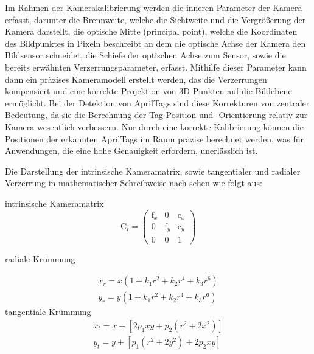 \documentclass[ngerman]{article}    %
\theoremstyle{definition}
\begin{document}
Im Rahmen der Kamerakalibrierung werden die inneren Parameter der Kamera erfasst, darunter die Brennweite, welche die Sichtweite und die Vergrößerung der Kamera darstellt, die optische Mitte (principal point), welche die Koordinaten des Bildpunktes in Pixeln beschreibt an dem die optische Achse der Kamera den Bildsensor schneidet, die Schiefe der optischen Achse zum Sensor, sowie die bereits erwähnten Verzerrungsparameter, erfasst. Mithilfe dieser Parameter kann dann ein präzises Kameramodell erstellt werden, das die Verzerrungen kompensiert und eine korrekte Projektion von 3D-Punkten auf die Bildebene ermöglicht. Bei der Detektion von AprilTags sind diese Korrekturen von zentraler Bedeutung, da sie die Berechnung der Tag-Position und -Orientierung relativ zur Kamera wesentlich verbessern. Nur durch eine korrekte Kalibrierung können die Positionen der erkannten AprilTags im Raum präzise berechnet werden, was für Anwendungen, die eine hohe Genauigkeit erfordern, unerlässlich ist. \cite{daftry2013flexible}



\newpage

Die Darstellung der intrinsische Kameramatrix, sowie tangentialer und radialer Verzerrung in mathematischer Schreibweise nach \cite{Zhang2023} sehen wie folgt aus:

intrinsische Kameramatrix
\begin{equation}   
    \text{C}_i =  \begin{pmatrix} \text{f}_x & 0 & \text{c}_x \\ 0 & \text{f}_y & \text{c}_y \\ 0 & 0 & 1 \end{pmatrix}
\end{equation}

radiale Krümmung

\begin{equation}
    \begin{split}
    x_{r} =  x( 1 + k_1 r^2 + k_2 r^4 + k_3 r^6)  \\
    y_{r} = y( 1 + k_1 r^2 + k_2 r^4 + k_3 r^6)
    \end{split}
\end{equation}
tangentiale Krümmung
\begin{equation}
    \begin{split}
        x_{t} = x + [ 2p_1xy + p_2(r^2+2x^2)] \\
        y_{t} = y + [ p_1(r^2+ 2y^2)+ 2p_2xy]
    \end{split}
\end{equation}
\end{document}
